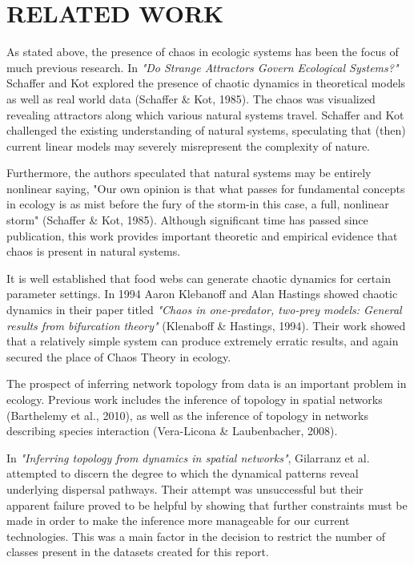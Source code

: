\documentclass[letterpaper, 10 pt, conference]{ieeeconf}  %
\begin{document}
\section{RELATED WORK}
	As stated above, the presence of chaos in ecologic systems has been the focus of much previous research. In \textit{"Do Strange Attractors Govern Ecological Systems?"} Schaffer and Kot explored the presence of chaotic dynamics in theoretical models as well as real world data (Schaffer \& Kot, 1985). The chaos was visualized revealing attractors along which various natural systems travel. Schaffer and Kot challenged the existing understanding of natural systems, speculating that (then) current linear models may severely misrepresent the complexity of nature. 
    
	Furthermore, the authors speculated that natural systems may be entirely nonlinear saying, "Our own opinion is that what passes for fundamental concepts in ecology is as mist before the fury of the storm-in this case, a full, nonlinear storm" (Schaffer \& Kot, 1985). Although significant time has passed since publication, this work provides important theoretic and empirical evidence that chaos is present in natural systems. 
    
	It is well established that food webs can generate chaotic dynamics for certain parameter settings. In 1994 Aaron Klebanoff and Alan Hastings showed chaotic dynamics in their paper titled \textit{"Chaos in one-predator, two-prey models: General results from bifurcation theory"} (Klenaboff \& Hastings, 1994). Their work showed that a relatively simple system can produce extremely erratic results, and again secured the place of Chaos Theory in ecology. 
  
	The prospect of inferring network topology from data is an important problem in ecology. Previous work includes the inference of topology in spatial networks (Barthelemy et al., 2010), as well as the inference of topology in networks describing species interaction (Vera-Licona \&  Laubenbacher, 2008). 
  
	In \textit{"Inferring topology from dynamics in spatial networks"}, Gilarranz et al. attempted to discern the degree to which the dynamical patterns reveal underlying dispersal pathways. Their attempt was unsuccessful but their apparent failure proved to be helpful by showing that further constraints must be made in order to make the inference more manageable for our current technologies. This was a main factor in the decision to restrict the number of classes present in the datasets created for this report. 
\end{document}
